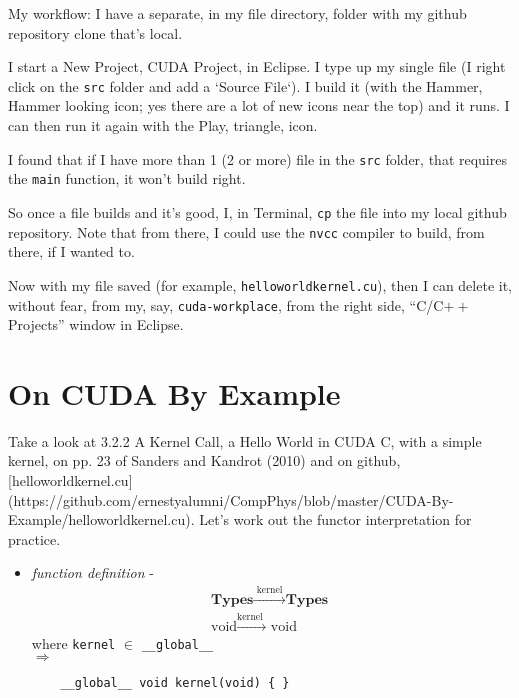 \documentclass[10pt]{amsart}
\begin{document}
\begin{multicols*}{2}
My workflow: I have a separate, in my file directory, folder with my github repository clone that's local.

I start a New Project, CUDA Project, in Eclipse.  I type up my single file (I right click on the \verb|src| folder and add a `Source File`).  I build it (with the Hammer, Hammer looking icon; yes there are a lot of new icons near the top) and it runs.  I can then run it again with the Play, triangle, icon.

I found that if I have more than 1 (2 or more) file in the \verb|src| folder, that requires the \verb|main| function, it won't build right.

So once a file builds and it's good, I, in Terminal, \verb|cp| the file into my local github repository.  Note that from there, I could use the \verb|nvcc| compiler to build, from there, if I wanted to.

Now with my file saved (for example, \verb|helloworldkernel.cu|), then I can delete it, without fear, from my, say, \verb|cuda-workplace|, from the right side, ``C/C$++$ Projects'' window in Eclipse.   

\section{On CUDA By Example}
Take a look at 3.2.2 A Kernel Call, a Hello World in CUDA C, with a simple kernel, on pp. 23 of Sanders and Kandrot (2010) \cite{SK2010} and on github, [helloworldkernel.cu](https://github.com/ernestyalumni/CompPhys/blob/master/CUDA-By-Example/helloworldkernel.cu).  Let's work out the functor interpretation for practice.

\begin{itemize}
\item \emph{function definition} - \[
  \begin{gathered}
    \textbf{Types} \xrightarrow{ \text{ kernel } } \textbf{Types } \\ 
    \text{void} \xrightarrow{ \text{kernel } } \text{ void }
  \end{gathered}
  \]
  where \verb|kernel| $\in $ \verb|__global__| \\
  $\Longrightarrow $
  \begin{lstlisting}
    __global__ void kernel(void) { }
  \end{lstlisting}


\end{itemize}
\end{multicols*}
\end{document}
